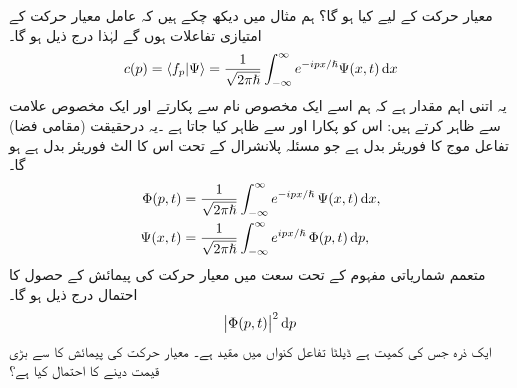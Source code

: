 معیار حرکت کے لیے کیا ہو گا؟ ہم مثال  میں دیکھ چکے ہیں کہ عامل  معیار حرکت کے  امتیازی تفاعلات   ہوں گے  لہٰذا درج ذیل ہو گا۔
\begin{align}
c(p) = \langle f_{p}  | \Psi \rangle = \frac{1}{\sqrt{2\pi\hslash}} \int_{-\infty}^{\infty} e^{-ipx/\hslash} \Psi (x,t)\dif x
\end{align}
یہ  اتنی اہم مقدار ہے کہ ہم اسے ایک مخصوص نام  سے پکارتے اور ایک مخصوص علامت سے ظاہر کرتے ہیں: اس کو پکارا اور   سے ظاہر کیا جاتا ہے ۔یہ  درحقیقت  (مقامی   فضا) تفاعل موج  کا فوریئر بدل ہے جو مسئلہ پلانشرال کے تحت اس کا الٹ فوریئر بدل ہے ہو گا۔
\begin{align}
\Phi(p,t) &= \frac{1}{\sqrt{2\pi\hslash}} \int_{-\infty}^{\infty} e^{-ipx/\hslash}\, \Psi (x,t) \dif x, \\ 
\Psi(x,t) &= \frac{1}{\sqrt{2\pi\hslash}} \int_{-\infty}^{\infty} e^{ipx/\hslash}\, \Phi (p,t) \dif p,
\end{align}
متعمم   شماریاتی مفہوم کے تحت سعت   میں معیار حرکت کی پیمائش کے حصول کا احتمال درج ذیل ہو گا۔ 
\begin{align}
\abs{ \Phi(p,t)}^{2}\dif p
\end{align}
 ایک ذرہ جس کی کمیت  ہے ڈیلٹا تفاعل کنواں  میں مقید ہے۔ معیار حرکت کی پیمائش کا   سے بڑی قیمت دینے کا احتمال  کیا ہے؟ 
 
